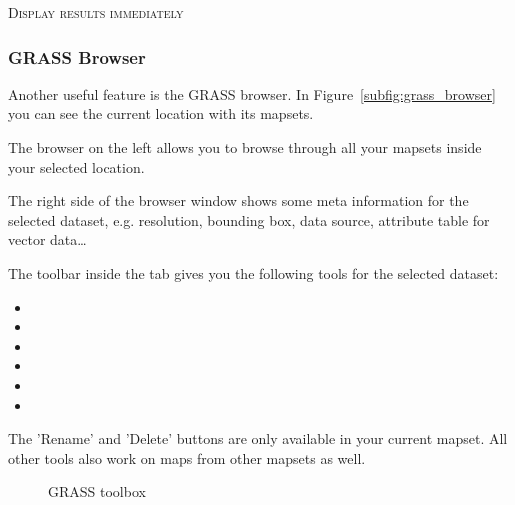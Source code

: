 \begin{Tip}\caption{\textsc{Display results immediately}}
\end{Tip} 


\subsubsection{GRASS Browser} 

Another useful feature is the GRASS browser. In Figure~\ref{subfig:grass_browser}
you can see the current location with its mapsets. 

The browser on the left allows you to browse through all your mapsets inside your selected
location. 

The right side of the browser window shows some meta information for the selected dataset, e.g. resolution,
bounding box, data source, attribute table for vector data\dots

The toolbar inside the  tab gives you the following tools for the selected dataset:
\begin{itemize}
\item {}
\item {}
\item {}
\item {}
\item {}
\item {}
\end{itemize}

The 'Rename' and 'Delete' buttons are only available in your current mapset. All other tools also work on
maps from other mapsets as well.

\begin{figure}[h]
\centering
	\caption{GRASS toolbox}
   \goodgap
\end{figure}

